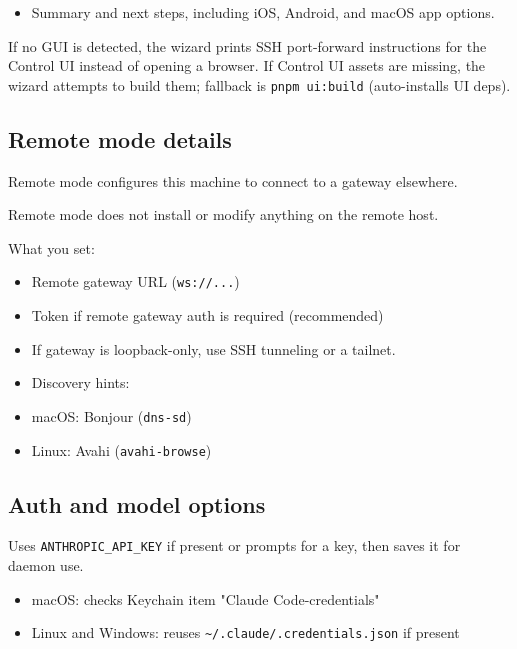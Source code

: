 \begin{itemize}
  \item Summary and next steps, including iOS, Android, and macOS app options.
\end{itemize}


If no GUI is detected, the wizard prints SSH port-forward instructions for the Control UI instead of opening a browser.
If Control UI assets are missing, the wizard attempts to build them; fallback is \texttt{pnpm ui:build} (auto-installs UI deps).

\subsection{Remote mode details}


Remote mode configures this machine to connect to a gateway elsewhere.

Remote mode does not install or modify anything on the remote host.

What you set:

\begin{itemize}
  \item Remote gateway URL (\texttt{ws://...})
  \item Token if remote gateway auth is required (recommended)
\end{itemize}


\begin{itemize}
  \item If gateway is loopback-only, use SSH tunneling or a tailnet.
  \item Discovery hints:
  \item macOS: Bonjour (\texttt{dns-sd})
  \item Linux: Avahi (\texttt{avahi-browse})
\end{itemize}


\subsection{Auth and model options}


Uses \texttt{ANTHROPIC\_API\_KEY} if present or prompts for a key, then saves it for daemon use.
\begin{itemize}
  \item macOS: checks Keychain item "Claude Code-credentials"
  \item Linux and Windows: reuses \texttt{\textasciitilde{}/.claude/.credentials.json} if present
\end{itemize}


